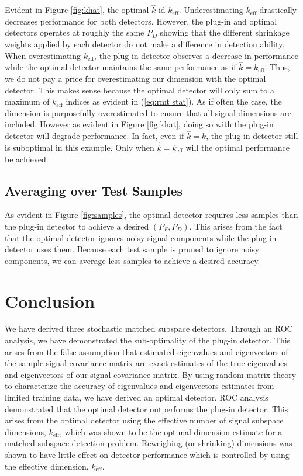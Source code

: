 Evident in Figure \ref{fig:khat}, the optimal $\widehat{k}$ id $k_\text{eff}$. Underestimating $k_\text{eff}$ drastically decreases performance for both detectors. However, the plug-in and optimal detectors operates at roughly the same $P_D$ showing that the different shrinkage weights applied by each detector do not make a difference in detection ability. When overestimating $k_\text{eff}$, the plug-in detector observes a decrease in performance while the optimal detector maintains the same performance as if $\widehat{k}=k_\text{eff}$. Thus, we do not pay a price for overestimating our dimension with the optimal detector. This makes sense because the optimal detector will only sum to a maximum of $k_\text{eff}$ indices as evident in (\ref{eq:rmt stat}). As if often the case, the dimension is purposefully overestimated to ensure that all signal dimensions are included. However as evident in Figure \ref{fig:khat}, doing so with the plug-in detector will degrade performance. In fact, even if $\widehat{k}=k$, the plug-in detector still is suboptimal in this example. Only when $\widehat{k}=k_\text{eff}$ will the optimal performance be achieved. 

\subsection{Averaging over Test Samples}

As evident in Figure \ref{fig:samples}, the optimal detector requires less samples than the plug-in detector to achieve a desired $(P_F, P_D)$. This arises from the fact that the optimal detector ignores noisy signal components while the plug-in detector uses them. Because each test sample is pruned to ignore noisy components, we can average less samples to achieve a desired accuracy.

\section{Conclusion}\label{sec:concl}
We have derived three stochastic matched subspace detectors. Through an ROC analysis, we have demonstrated the sub-optimality of the plug-in detector. This arises from the false assumption that estimated eigenvalues and eigenvectors of the sample signal covariance matrix are exact estimates of the true eigenvalues and eigenvectors of our signal covariance matrix. By using random matrix theory to characterize the accuracy of eigenvalues and eigenvectors estimates from limited training data, we have derived an optimal detector. ROC analysis demonstrated that the optimal detector outperforms the plug-in detector. This arises from the optimal detector using the effective number of signal subspace dimensions, $k_\text{eff}$, which was shown to be the optimal dimension estimate for a matched subspace detection problem. Reweighing (or shrinking) dimensions was shown to have little effect on detector performance which is controlled by using the effective dimension, $k_\text{eff}$.


